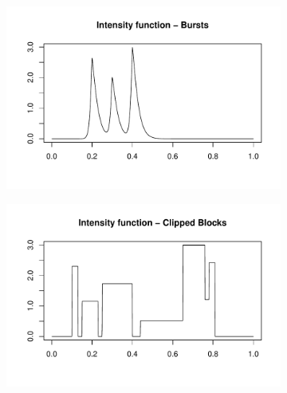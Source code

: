 \documentclass[12pt]{article}
\begin{document}
\begin{figure}
\begin{subfigure}[b]{0.48\textwidth}
        \caption{}
        \label{fig:pois_hs}
    \end{subfigure}
		\hfill
    \begin{subfigure}[b]{0.48\textwidth}
        \centering
        \includegraphics[width=\textwidth]{pois_bur.pdf}
        \caption{}
        \label{fig:pois_bur}
    \end{subfigure}
		\hfill
    \begin{subfigure}[b]{0.48\textwidth}
        \centering
        \includegraphics[width=\textwidth]{pois_cblk.pdf}
        \caption{}
        \label{fig:pois_cblk}
    \end{subfigure}
		\hfill
		\begin{subfigure}[b]{0.48\textwidth}
        \centering

\end{subfigure}
\end{figure}
\end{document}
